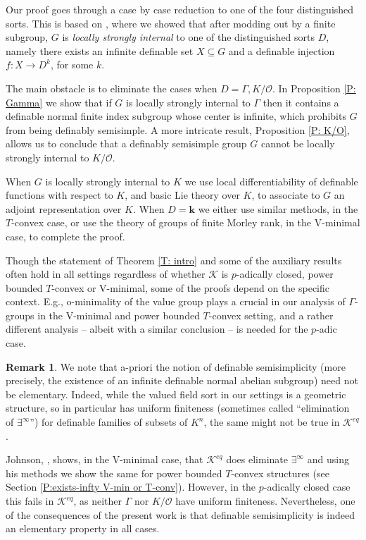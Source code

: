 \documentclass[11pt]{amsart}
\theoremstyle{definition}
\newtheorem{remark}[theorem]{Remark}
\newcommand{\bk}{\textbf{k}}
\newcommand{\CK}{{\mathcal K}}
\newcommand{\CO}{{\mathcal O}}
\newcommand{\0}{\emptyset}
\def\sub{\subseteq}
\begin{document}
Our proof goes through a case by case reduction to one of the four distinguished sorts. This is based on \cite{HaHaPeGps}, where we showed that after modding out by a finite subgroup, $G$ is {\em locally strongly internal} to one of the distinguished sorts $D$, namely there exists 
 an infinite definable set $X\sub G$ and a definable injection $f:X\to D^k$, for some $k$.

The main obstacle is to eliminate the cases when  $D=\Gamma,K/\CO$. In Proposition \ref{P: Gamma} we show that if 
 $G$ is locally strongly internal to $\Gamma$ then it contains a definable normal finite index subgroup whose center is infinite, which prohibits $G$ from being definably semisimple. 
A more intricate result, Proposition \ref{P: K/O}, allows us to conclude that a definably semisimple group $G$ cannot be locally strongly internal to $K/\CO$. 

When $G$ is locally strongly internal to $K$ we use local differentiability of definable functions with respect to  $K$, and basic Lie theory over $K$, to associate to $G$ an adjoint representation over $K$. When $D=\bk$ we either use similar methods, in the $T$-convex case, or use the theory of groups of finite Morley rank, in the V-minimal case, to complete the proof.





    
Though the statement of Theorem \ref{T: intro} and some of the   auxiliary results  often hold in all settings regardless of whether $\CK$ is $p$-adically closed, power bounded $T$-convex or V-minimal, some of the proofs depend  on the specific context. E.g., o-minimality of the value group plays a crucial in our analysis of $\Gamma$-groups in the V-minimal and power bounded $T$-convex setting, and a rather different analysis --  albeit with a similar conclusion -- is needed for the $p$-adic case. 

\begin{remark}
We note that a-priori the notion of definable semisimplicity (more precisely,  the existence of an infinite definable normal abelian subgroup) need not be elementary.
Indeed, while the valued field sort in our settings is a geometric structure, so in particular has uniform finiteness (sometimes called ``elimination of $\exists^\infty$'') for definable families of subsets of $K^n$, 
the same  might not be true in $\CK^{eq}$.

Johnson, \cite{JohCminimalexist}, shows, in the V-minimal case, that $\CK^{eq}$ does eliminate $\exists^\infty$ and using his methods we show the same for power bounded $T$-convex structures (see Section \ref{P:exists-infty V-min or T-conv}). However, 
in the $p$-adically closed case this fails in $\CK^{eq}$, as neither  $\Gamma$  nor  $K/\CO$ have uniform finiteness. Nevertheless,  one of the consequences of the present work is that definable semisimplicity is indeed an elementary property in all cases.
\end{remark}
\end{document}
